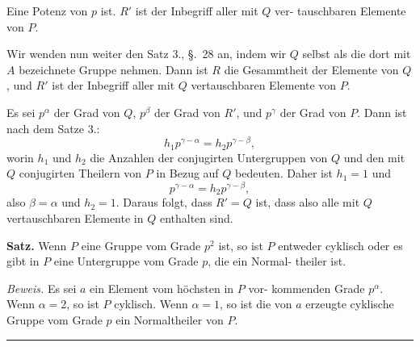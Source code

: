 \documentclass[12pt,a4paper]{article}
\begin{document}
Eine Potenz von $p$ ist. $R'$ ist der Inbegriff aller mit $Q$ ver-
tauschbaren Elemente von $P$.

Wir wenden nun weiter den Satz 3., \S.~28 an, indem wir
$Q$ selbst als die dort mit $A$ bezeichnete Gruppe nehmen.
Dann ist $R$ die Gesammtheit der Elemente von $Q$, und $R'$
ist der Inbegriff aller mit $Q$ vertauschbaren Elemente von $P$.

Es sei $p^\alpha$ der Grad von $Q$, $p^\beta$ der Grad von $R'$, und
$p^\gamma$ der Grad von $P$. Dann ist nach dem Satze 3.:
\[h_1 p^{\gamma - \alpha} = h_2 p^{\gamma - \beta},\]
worin $h_1$ und $h_2$ die Anzahlen der conjugirten Untergruppen
von $Q$ und den mit $Q$ conjugirten Theilern von $P$
in Bezug auf $Q$ bedeuten. Daher ist $h_1 = 1$ und
\[p^{\gamma - \alpha} = h_2 p^{\gamma - \beta},\]
also $\beta = \alpha$ und $h_2 = 1$. Daraus folgt, dass $R' = Q$ ist, dass
also alle mit $Q$ vertauschbaren Elemente in $Q$ enthalten sind.

\medskip
\noindent\textbf{Satz.} Wenn $P$ eine Gruppe vom Grade $p^2$ ist, so
ist $P$ entweder cyklisch oder es gibt in $P$
eine Untergruppe vom Grade $p$, die ein Normal-
theiler ist.

\medskip
\noindent\textit{Beweis.} Es sei $a$ ein Element vom h\"ochsten in $P$ vor-
kommenden Grade $p^\alpha$. Wenn $\alpha = 2$, so ist $P$ cyklisch.
Wenn $\alpha = 1$, so ist die von $a$ erzeugte cyklische Gruppe
vom Grade $p$ ein Normaltheiler von $P$.

\bigskip
\begin{center}
\rule{0.5\textwidth}{0.4pt}
\end{center}
\end{document}
